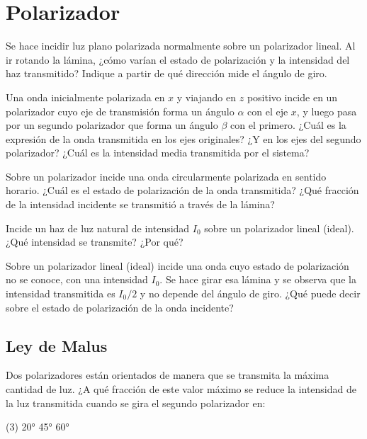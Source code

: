 \section*{Polarizador}

\item Se hace incidir luz plano polarizada normalmente sobre un polarizador lineal.
Al ir rotando la lámina, ¿cómo varían el estado de polarización y la intensidad del haz transmitido? Indique a partir de qué dirección
mide el ángulo de giro.



\item Una onda inicialmente polarizada en \(x\) y viajando en \(z\) positivo incide en un polarizador cuyo eje de transmisión forma un ángulo \(\alpha\) con el eje \(x\), y luego pasa por un segundo polarizador que forma un ángulo \(\beta\) con el primero.
¿Cuál es la expresión de la onda transmitida en los ejes originales?
¿Y en los ejes del segundo polarizador?
¿Cuál es la intensidad media transmitida por el sistema?



\item Sobre un polarizador incide una onda circularmente polarizada en sentido horario.
¿Cuál es el estado de polarización de la onda transmitida?
¿Qué fracción de la intensidad incidente se transmitió a través de la lámina?



\item Incide un haz de luz natural de intensidad $I_0$ sobre un polarizador lineal (ideal). ¿Qué intensidad se transmite? ¿Por qué?



\item Sobre un polarizador lineal (ideal) incide una onda cuyo estado de polarización no se conoce, con una intensidad $I_0$.
Se hace girar esa lámina y se observa que la intensidad transmitida es $I_0/2$ y no depende del ángulo de giro.
¿Qué puede decir sobre el estado de polarización de la onda incidente?



\subsection*{Ley de Malus}

\item Dos polarizadores están orientados de manera que se transmita la máxima cantidad de luz.
¿A qué fracción de este valor máximo se reduce la intensidad de la luz transmitida cuando se gira el segundo polarizador en:
\begin{tasks}(3)
	\task \ang{20;;}
	\task \ang{45;;}
	\task \ang{60;;}
\end{tasks}



